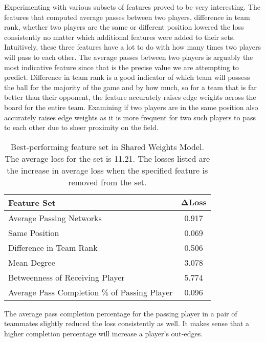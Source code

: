 \documentclass[11pt,letterpaper]{article}
\begin{document}
Experimenting with various subsets of features proved to be very interesting.  The features that computed average passes between two players, difference in team rank, whether two players are the same or different position lowered the loss consistently no matter which additional features were added to their sets.  Intuitively, these three features have a lot to do with how many times two players will pass to each other.  The average passes between two players is arguably the most indicative feature since that is the precise value we are attempting to predict.  Difference in team rank is a good indicator of which team will possess the ball for the majority of the game and by how much, so for a team that is far better than their opponent, the feature accurately raises edge weights across the board for the entire team. Examining if two players are in the same position also accurately raises edge weights as it is more frequent for two such players to pass to each other due to sheer proximity on the field.


\begin {table}
\begin{center}

\begin{tabularx}{\columnwidth}{|X|c|}
\hline \bf{Feature Set} & $\mathbf{\Delta Loss}$ \\ \hline
Average Passing Networks & 0.917 \\ \hline
Same Position & 0.069 \\ \hline
Difference in Team Rank & 0.506 \\ \hline
Mean Degree & 3.078 \\ \hline
Betweenness of Receiving Player & 5.774 \\ \hline
Average Pass Completion \% of Passing Player & 0.096 \\ \hline
\end{tabularx} 

\caption {Best-performing feature set in Shared Weights Model. The average loss for the set is 11.21. The losses listed are the increase in average loss when the specified feature is removed from the set.}
\end{center}
\end {table}

The average pass completion percentage for the passing player in a pair of teammates slightly reduced the loss consistently as well. It makes sense that a higher completion percentage will increase a player's out-edges.
\end{document}
